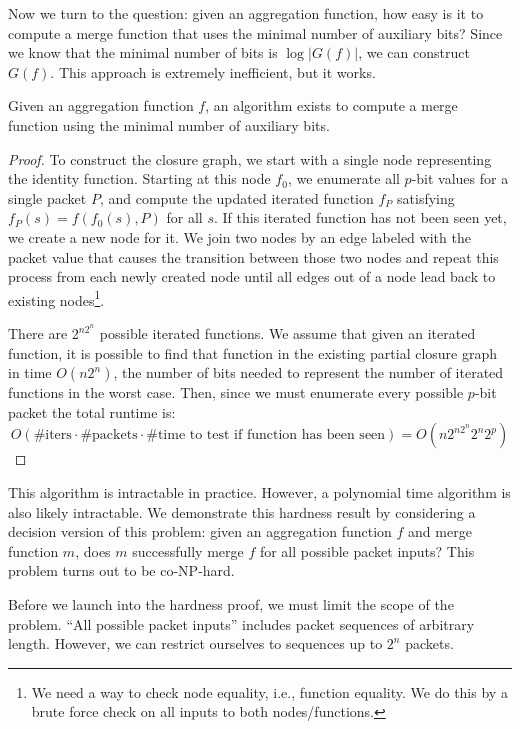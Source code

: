 Now we turn to the question: given an aggregation function, how easy is it to compute a merge function that uses the minimal number of auxiliary bits? Since we know that the minimal number of bits is $\log |G(f)|$, we can construct $G(f)$. This approach is extremely inefficient, but it works. 

\begin{theorem}[Theorem 4.3.4]
Given an aggregation function $f$, an algorithm exists to compute a merge function using the minimal number of auxiliary bits.
\end{theorem}
\begin{proof}
To construct the closure graph, we start with a single node representing the
identity function. Starting at this node $f_0$, we enumerate all $p$-bit values for a
single packet $P$, and compute the updated iterated function $f_P$ satisfying $f_P(s) = f(f_0(s), P)$ for all $s$.
If this iterated function has not been seen yet, we create a new node for it.
We join two nodes by an edge labeled
with the packet value that causes the transition between those two nodes and
repeat this process from each newly created node until all edges out of a node
lead back to existing nodes\footnote{We need a way to check node equality,
i.e., function equality. We do this by a brute force check on all inputs to
both nodes/functions.}.

There are $2^{n2^n}$ possible iterated functions. We assume that given an iterated function,
it is possible to find that function in the existing partial closure graph in time $O(n2^n)$,
the number of bits needed to represent the number of iterated functions in the worst case.
Then, since we must enumerate every possible $p$-bit packet the total runtime is:
\[ O(\text{\# iters} \cdot \text{\# packets} \cdot \text{\# time to test if function has been seen}) = O\left(n2^{n2^n}2^n2^p\right) \]
\end{proof}

This algorithm is intractable in practice. However, a polynomial time algorithm is also likely intractable.
We demonstrate this hardness result by considering a decision version of this problem:
given an aggregation function $f$ and merge function $m$, does $m$ successfully merge $f$ for all possible packet inputs?
This problem turns out to be co-NP-hard.

Before we launch into the hardness proof, we must limit the scope of the problem. ``All possible packet inputs'' includes
packet sequences of arbitrary length. However, we can restrict ourselves to sequences up to $2^n$ packets.

